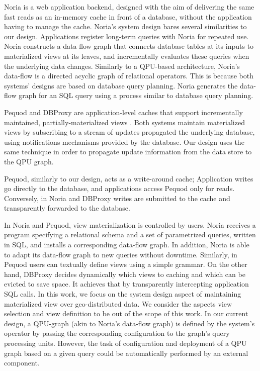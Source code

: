 Noria \cite{gjengset:noria} is a web application backend,
designed with the aim of delivering the same fast reads as an in-memory cache in front of a database,
without the application having to manage the cache.
Noria's system design bares several similarities to our design.
Applications register long-term queries with Noria for repeated use.
Noria constructs a data-flow graph that connects database tables at its inputs to materialized views at its leaves,
and incrementally evaluates these queries when the underlying data changes.
Similarly to a QPU-based architecture, Noria’s data-flow is a directed acyclic graph of relational operators.
This is because both systems' designs are based on database query planning.
Noria generates the data-flow graph for an SQL query using a process similar to database query planning.

Pequod \cite{kate:pequod} and DBProxy \cite{amiri:dbproxy} are application-level caches that support incrementally
maintained, partially-materialized views \cite{zhou:dynamicmv}.
Both systems maintain materialized views by subscribing to a stream of updates propagated the underlying database,
using notifications mechanisms provided by the database.
Our design uses the same technique in order to propagate update information from the data store to the QPU graph.

Pequod, similarly to our design, acts as a write-around cache;
Application writes go directly to the database, and applications access Pequod only for reads.
Conversely, in Noria and DBProxy writes are submitted to the cache and transparently forwarded to the database.

In Noria and Pequod, view materialization is controlled by users.
Noria receives a program specifying a relational schema and a set of parametrized queries, written in SQL,
and installs a corresponding data-flow graph.
In addition, Noria is able to adapt its data-flow graph to new queries without downtime.
Similarly, in Pequod users can textually define views using a simple grammar.
On the other hand, DBProxy decides dynamically which views to caching and which can be evicted to save space.
It achieves that by transparently intercepting application SQL calls.
In this work, we focus on the system design aspect of maintaining materialized view over geo-distributed data.
We consider the aspects view selection and view definition to be out of the scope of this work.
In our current design, a QPU-graph (akin to Noria's data-flow graph) is defined by the system's operator by passing
the corresponding configuration to the graph's query processing units.
However, the task of configuration and deployment of a QPU graph based on a given query could be automatically performed
by an external component.

